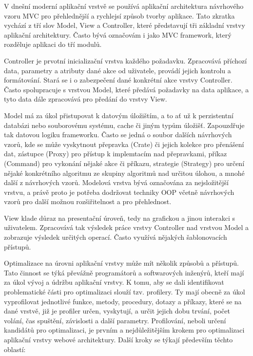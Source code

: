 \documentclass[12pt]{article}
\begin{document}
V dnešní moderní aplikační vrstvě se používá aplikační architektura návrhového vzoru MVC pro přehlednější a rychlejsí způsob tvorby aplikace. Tato zkratka vychází z tří slov Model, View a Controller, které představují tři základní vrstvy aplikační architektury. Často bývá označovám i jako MVC framework, který rozděluje aplikaci do tří modulů. \cite{design-patterns}

Controller je prvotní inicializační vrstva každého požadavku. Zpracovává příchozí data, parametry a atributy dané akce od uživatele, provádí jejich kontrolu a formátování. Stará se i o zabezpečení dané konkrétní akce vrstvy Controller. Často spolupracuje s vrstvou Model, které předává požadavky na data aplikace, a tyto data dále zpracovává pro předání do vrstvy View. \cite{design-patterns}

Model má za úkol přistupovat k datovým úložištím, a to ať už k perzistentní databázi nebo souborovému systému, cache či jiným typům úložišť. Zapouzdřuje tak datovou logiku frameworku. Často se jedná o soubor dalších návrhových vzorů, kde se může vyskytnout přepravka (Crate) či jejich kolekce pro přenášení dat, zástupce (Proxy) pro přístup k implemtacím nad přepravkami, příkaz (Command) pro vykonání nějaké akce či příkazu, strategie (Strategy) pro určení nějaké konkrétního algoritmu ze skupiny algoritmů nad určitou úlohou, a mnohé další z návrhových vzorů. Modelová vrstva bývá označována za nejsložitější vrstvu, a právě proto je potřeba dodržovat techniky OOP včetně návrhových vzorů pro další možnou rozšiřitelnost a pro přehlednost. \cite{design-patterns}

View klade důraz na presentační úroveň, tedy na grafickou a jinou interakci s uživatelem. Zpracovává tak výsledek práce vrstvy Controller nad vrstvou Model a zobrazuje výsledek určitých operací. Často využívá nějakých šablonovacích přístupů. \cite{design-patterns}

\clearpage

\obrazek
{}

\label{sec:profiler}
Optimalizace na úrovni aplikační vrstvy může mít několik způsobů a přístupů. Tato činnost se týká převážně programátorů a softwarových inženýrů, kteří mají za úkol vývoj a údržbu aplikační vrstvy. K tomu, aby se dali identifikovat problematické části pro optimalizaci slouží tzv. profilery. Ty mají obecně za úkol vyprofilovat jednotlivé funkce, metody, procedury, dotazy a příkazy, které se na dané vrstvě, již je profiler určen, vyskytují, a určit jejich dobu trvání, počet volání, čas spuštění, závislosti a další parametry. Profilování, neboli určení kandidátů pro optimalizaci, je prvním a nejdůležitějším krokem pro optimalizaci aplikační vrstvy webové architektury. Další kroky se týkají především těchto oblastí:
\end{document}

